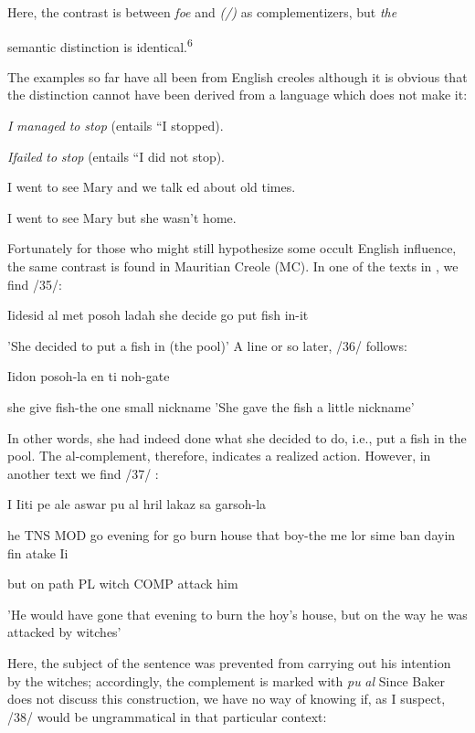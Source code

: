 Here, the contrast is between \textit{foe }and \textit{(/)} as complementizers, but \textit{the}

semantic distinction is identical.\textsuperscript{6}

The examples so far have all been from English creoles although it is obvious that the distinction cannot have been derived from a lan\-guage which does not make it:

\ea\label{ex:31}
 \textit{I} \textit{managed} \textit{to} \textit{stop} (entails ``I stopped{\textquotedbl}).
\glt
\z

\ea\label{ex:32}
 \textit{I}\textit{failed} \textit{to} \textit{stop} (entails ``I did not stop{\textquotedbl}).
\glt
\z

\ea\label{ex:33}
 I went to see Mary and we talk ed about old times.
\glt
\z

\ea\label{ex:34}
 I went to see Mary but she wasn't home.
\glt
\z

Fortunately for those who might still hypothesize some occult English influence, the same contrast is found in Mauritian Creole (MC). In one of the texts in \citet{Baker1972}, we find /35/:

\ea\label{ex:35}
 Iidesid al met posoh ladah she decide go put fish in-it
\glt
\z

'She decided to put a fish in (the pool)' A line or so later, /36/ follows:

\ea\label{ex:36}
 Iidon posoh-la en ti noh-gate
\glt
\z

she give fish-the one small nickname 'She gave the fish a little nickname'



In other words, she had indeed done what she decided to do, i.e., put a fish in the pool. The al-complement, therefore, indicates a realized action. However, in another text we find /37/ :

\ea\label{ex:37}
  I Iiti pe ale aswar pu al hril lakaz sa garsoh-la
\glt
\z

he TNS MOD go evening for go burn house that boy-the me lor sime ban dayin fin atake Ii

but on path PL witch COMP attack him

'He would have gone that evening to burn the hoy's house, but on the way he was attacked by witches'

Here, the subject of the sentence was prevented from carrying out his intention by the witches; accordingly, the complement is marked with \textit{pu} \textit{al} Since Baker does not discuss this construction, we have no way of knowing if, as I suspect, /38/ would be ungrammatical in that particular context:


